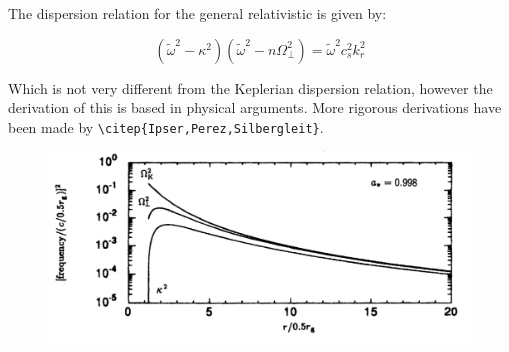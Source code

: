 The dispersion relation for the general relativistic is given by:

\begin{equation}\label{reladispersion}
(\tilde{\omega}^2 - \kappa^2)(\tilde{\omega}^2 - n\Omega_{\bot}^2 ) =
\tilde{\omega}^2 c_s^2 k_r^2
\end{equation}

Which is not very different from the Keplerian dispersion relation,
however the derivation of this is based in physical arguments. More
rigorous derivations have been made by
\verb+\citep{Ipser,Perez,Silbergleit}+.

\begin{figure}\label{fig:rela}
\centering
\includegraphics[scale=0.3]{relativsitc.png}
\end{figure}

